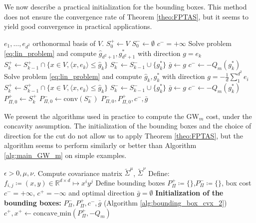 \documentclass{article}
\newcommand{\R}{\mathbb{R}}
\newcommand{\1}{\mathbf{1}}
\newcommand{\GW}{\mathrm{GW}}
\theoremstyle{definition}
\theoremstyle{remark}
\begin{document}
\begin{appendices}
We now describe a practical initialization for the bounding boxes. This method does not ensure the convergence rate of Theorem \ref{theo:FPTAS}, but it seems to yield good convergence in practical applications.
\begin{algorithm}
\caption{Bounding box initialization (alternative)}\label{alg:bounding_box_cvx_2}
\begin{algorithmic}[1]
\Require $e_1,\dots,e_{d^2}$ orthonormal basis of $V$.
\State $S_0^+\gets V$
\State $S_0^-\gets \emptyset$
\State $c^- = +\infty$
    \State Solve problem \eqref{eq:lin_problem} and compute $\hat{g}_{ d^2+1}, g^*_{d^2+1}$ with direction $g= e_k$
    \State $S_k^+ \gets S_{k-1}^+\cap\{x\in V, \langle x,  e_k\rangle\leq  \hat{g}_{k}\}$
    \State $S_k^-\gets S_{k-1}^-\cup \{g^*_{k}\} $
        \State $\bar{g}\gets g$
        \State $c^-\gets-Q_m(g^*_{k})$
    \EndIf
\EndFor
\State Solve problem \eqref{eq:lin_problem} and compute $\hat{g}_{ k}, g^*_{k}$ with direction $g= -\frac{1}{d}\sum_{1}^{d^2} e_i$
\State $S_k^+ \gets S_{k-1}^+\cap\{x\in V, \langle x,  e_k\rangle\leq  \hat{g}_{k}\}$
\State $S_k^-\gets S_{k-1}^-\cup \{g^*_{k}\} $
    \State $\bar{g}\gets g$
    \State $c^-\gets-Q_m(g^*_{k})$
\EndIf
\State $P_{\Pi,0}^+\gets S_k^+$ 
\State $P_{\Pi,0}^-\gets \mathrm{conv}(S_k^-)$
\State\Return $P_{\Pi,0}^-,P_{\Pi,0}^+, c^-, \bar{g}$

\end{algorithmic}
\end{algorithm}



We present the algorithms used in practice to compute the $\GW_m$ cost, under the concavity assumption. The initialization of the bounding boxes and the choice of direction for the cut do not allow us to apply Theorem \ref{theo:FPTAS}, but the algorithm seems to perform similarly or better than Algorithm \ref{alg:main_GW_m} on simple examples.
\begin{algorithm}
\caption{Main algorithm for $\GW_m$ in dimension $d$, concave cost}\label{alg:parctical_concave}
\begin{algorithmic}[1]
\Require $\epsilon>0, \mu,\nu$.
\State Compute covariance matrix $\tilde{\Sigma}^{\mu}$, $\tilde{\Sigma}^{\nu}$
\State Define:$f_{i,j}\coloneqq (x,y)\in \R^{d\times d}\mapsto x^iy^j$
\State Define bounding boxes $P_\Pi^+\coloneqq\{\}$,$P_\Pi^-\coloneqq\{\}$, box cost $c^- = +\infty$, $c^+ = -\infty$ and optimal direction $\bar{g}=\emptyset$
 \State  \textbf{Initialization of the bounding boxes: }  $P_\Pi^-,P_\Pi^+,c^-, \bar{g}$ (Algorithm \ref{alg:bounding_box_cvx_2})
\State $c^+,x^+\gets \mathrm{concave\_min}(P_\Pi^+, -Q_m)$ 


\end{algorithmic}
\end{algorithm}
\end{appendices}
\end{document}
